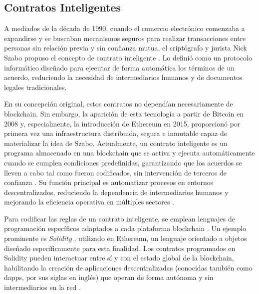 \subsection{Contratos Inteligentes}
\label{sec:smart-contracts}

A mediados de la década de 1990, cuando el comercio electrónico comenzaba a expandirse y se buscaban mecanismos seguros para realizar transacciones entre personas sin relación previa y sin confianza mutua, el criptógrafo y jurista Nick Szabo propuso el concepto de contrato inteligente \cite{buterin2013ethereum}. Lo definió como un protocolo informático diseñado para ejecutar de forma automática los términos de un acuerdo, reduciendo la necesidad de intermediarios humanos y de documentos legales tradicionales.

En su concepción original, estos contratos no dependían necesariamente de blockchain. Sin embargo, la aparición de esta tecnología a partir de Bitcoin en 2008 y, especialmente, la introducción de Ethereum en 2015, proporcionó por primera vez una infraestructura distribuida, segura e inmutable capaz de materializar la idea de Szabo. Actualmente, un contrato inteligente es un programa almacenado en una blockchain que se activa y ejecuta automáticamente cuando se cumplen condiciones predefinidas, garantizando que los acuerdos se lleven a cabo tal como fueron codificados, sin intervención de terceros de confianza \cite{bulkowska2023implementation}. Su función principal es automatizar procesos en entornos descentralizados, reduciendo la dependencia de intermediarios humanos \cite{verma2023overview} y mejorando la eficiencia operativa en múltiples sectores \cite{sunny2022systematic}.

Para codificar las reglas de un contrato inteligente, se emplean lenguajes de programación específicos adaptados a cada plataforma blockchain \cite{bartolomeo2020introduccion}. Un ejemplo prominente es \textit{Solidity} \cite{taherdoost2023smart}, utilizado en Ethereum, un lenguaje orientado a objetos diseñado específicamente para esta finalidad. Los contratos programados en Solidity pueden interactuar entre sí y con el estado global de la blockchain, habilitando la creación de aplicaciones descentralizadas (conocidas también como \acrshort{dapps}, por sus siglas en inglés) que operan de forma autónoma y sin intermediarios en la red \cite{buterin2013ethereum}.

